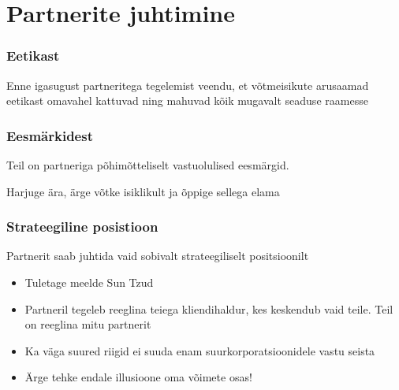 \section{Partnerite juhtimine}
\begin{frame}[fragile]
  \frametitle{Eetikast}
	\begin{center}
		Enne igasugust partneritega tegelemist veendu, et võtmeisikute arusaamad eetikast omavahel kattuvad ning mahuvad kõik mugavalt seaduse raamesse 
	\end{center}
\end{frame}

\begin{frame}[fragile]
  \frametitle{Eesmärkidest}
	\begin{center}
		Teil on partneriga põhimõtteliselt vastuolulised eesmärgid. \par Harjuge ära, ärge võtke isiklikult ja õppige sellega elama
	\end{center}
\end{frame}


\begin{frame}[fragile]
  \frametitle{Strateegiline posistioon}
  	Partnerit saab juhtida vaid sobivalt strateegiliselt positsioonilt	
	\begin{itemize}
		\item Tuletage meelde Sun Tzud
		\item Partneril tegeleb reeglina teiega kliendihaldur, kes keskendub vaid teile. Teil on reeglina mitu partnerit
		\item Ka väga suured riigid ei suuda enam suurkorporatsioonidele vastu seista \citep{partner}
		\item Ärge tehke endale illusioone oma võimete osas!
	\end{itemize}
\end{frame}


